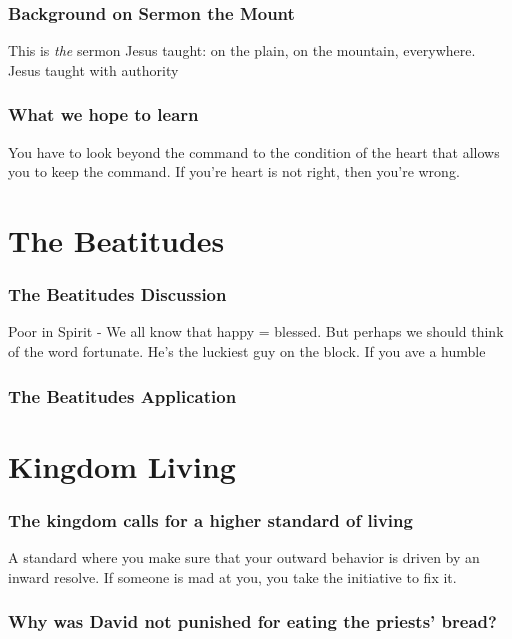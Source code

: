 \begin{frame}
\frametitle{Background on Sermon the Mount}
This is \emph{the} sermon Jesus taught: on the plain, on the mountain, everywhere.
Jesus taught with authority
\end{frame}

\begin{frame}
\frametitle{What we hope to learn}
You have to look beyond the command to the condition of the heart that allows you to keep the command.
If you're heart is not right, then you're wrong.
\end{frame}

\begin{frame}
\frametitle{\insertlecture}
\tableofcontents[sectionstyle=show/show]
\end{frame}

\section{The Beatitudes}
\begin{frame}
\frametitle{The Beatitudes Discussion}
Poor in Spirit - 
We all know that happy = blessed.  But perhaps we should think of the word fortunate.  He's the luckiest guy on the block. 
If you ave a humble 
\end{frame}

\begin{frame}
\frametitle{The Beatitudes Application}
\end{frame}

\section{Kingdom Living}

\begin{frame}
\frametitle{The kingdom calls for a higher standard of living}
A standard where you make sure that your outward behavior is driven by an inward resolve.
If someone is mad at you, you take the initiative to fix it.
\end{frame}

\begin{frame}
\frametitle{Why was David not punished for eating the priests' bread?}
\end{frame}
